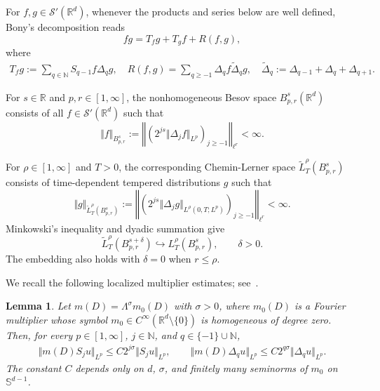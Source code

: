 \documentclass[reqno,11pt,a4paper]{amsart}
\newtheorem{lemma}[theorem]{Lemma}
\newcommand{\R}{\ensuremath{\mathbb{R}}}
\begin{document}
For $f,g\in\mathcal S'(\R^d)$,
whenever the products and series below are well defined,
Bony's decomposition reads
\[
  fg=T_fg+T_gf+R(f,g),
\]
where
\begin{align*}
  T_f g:= \sum_{q\in \mathbb{N}} S_{q-1}f \Delta_q g,\quad R(f,g)=\sum_{q\geq -1}\Delta_q f \widetilde{\Delta}_q g,\quad
  \widetilde{\Delta}_q := \Delta_{q-1} + \Delta_q + \Delta_{q+1}.
\end{align*}

For $s\in\R$ and $p,r\in[1,\infty]$,
the nonhomogeneous Besov space $B^s_{p,r}(\R^d)$
consists of all $f\in\mathcal S'(\R^d)$ such that
\[
  \Vert f\Vert _{B^s_{p,r}}
  :=
  \left\Vert 
    \left(2^{js}\Vert \Delta_jf\Vert _{L^p}\right)_{j\geq-1}
  \right\Vert _{\ell^r}
  <\infty.
\]

For $\rho\in[1,\infty]$ and $T>0$,
the corresponding Chemin-Lerner space
$\widetilde L^\rho_T(B^s_{p,r})$
consists of time-dependent tempered distributions $g$
such that
\[
  \Vert g\Vert _{\widetilde L^\rho_T(B^s_{p,r})}
  :=
  \left\Vert 
    \left(
      2^{js}\Vert \Delta_jg\Vert _{L^\rho(0,T;L^p)}
    \right)_{j\geq-1}
  \right\Vert _{\ell^r}
  <\infty.
\]
Minkowski's inequality and dyadic summation give
\[
  \widetilde L^\rho_T(B^{s+\delta}_{p,r})
  \hookrightarrow L^\rho_T(B^s_{p,r}),
  \qquad \delta>0.
\]
The embedding also holds with $\delta=0$
when $r\leq\rho$.

We recall the following localized multiplier estimates;
see~\cite[Proposition~3.1]{HKR11}.
\begin{lemma}\label{lem:m(D)}
Let $m(D)=\Lambda^\sigma m_0(D)$ with $\sigma>0$,
where $m_0(D)$ is a Fourier multiplier
whose symbol $m_0\in C^\infty(\R^d\setminus\{0\})$
is homogeneous of degree zero.
Then, for every $p\in[1,\infty]$,
$j\in\mathbb N$, and $q\in\{-1\}\cup\mathbb N$,
\begin{equation}\label{es:mD-Sj-Lp}
\begin{aligned}
  \Vert m(D)S_ju\Vert _{L^p}
  \leq C2^{j\sigma}\Vert S_ju\Vert _{L^p},
  \qquad
  \Vert m(D)\Delta_qu\Vert _{L^p}
  \leq C2^{q\sigma}\Vert \Delta_qu\Vert _{L^p}.
\end{aligned}
\end{equation}
The constant $C$ depends only on $d$, $\sigma$,
and finitely many seminorms of $m_0$ on $\mathbb S^{d-1}$.
\end{lemma}
\end{document}
